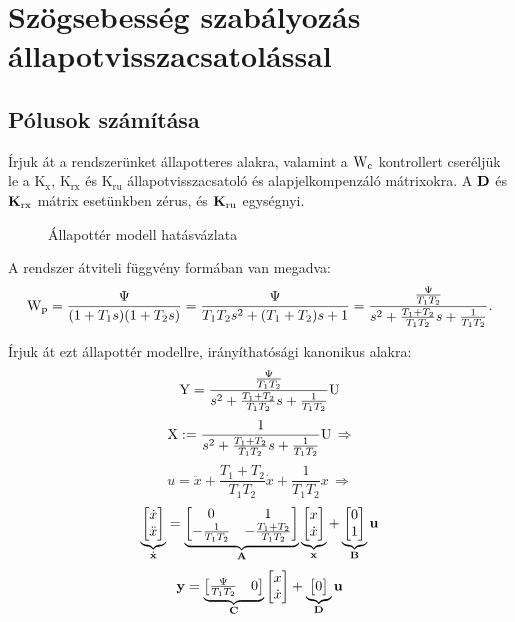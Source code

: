 \section{Szögsebesség szabályozás állapotvisszacsatolással}

\subsection{Pólusok számítása}

Írjuk át a rendszerünket állapotteres alakra, valamint a $\mathrm{W}_\text{c}$ kontrollert
cseréljük le a $\mathrm{K}_\text{x}$, $\mathrm{K}_\text{rx}$ és $\mathrm{K}_\text{ru}$ állapotvisszacsatoló és
alapjelkompenzáló mátrixokra.
A $\boldsymbol{\mathrm{D}}$ és $\boldsymbol{\mathrm{K}}_\text{rx}$ mátrix esetünkben zérus, és $\boldsymbol{\mathrm{K}}_\text{ru}$ egységnyi.

\begin{figure}[H]
    \centering
    \caption{Állapottér modell hatásvázlata}
    \label{fig:6a_allapotter_hatasvazlat}
\end{figure}

A rendszer átviteli függvény formában van megadva:
\begin{equation}
	\mathrm{W}_\text{p} = \frac{\Psi}{(1+T_1s)(1+T_2s)} = \frac{\Psi}{T_1T_2s^2+(T_1+T_2)s+1} = 
	\frac{\frac{\Psi}{T_1T_2}}{s^2+\frac{T_1+T_2}{T_1T_2}s+\frac{1}{T_1T_2}}.
\end{equation}

Írjuk át ezt állapottér modellre, irányíthatósági kanonikus alakra:
\begin{equation}
	\mathrm{Y} = \frac{\frac{\Psi}{T_1T_2}}{s^2+\frac{T_1+T_2}{T_1T_2}s+\frac{1}{T_1T_2}}\mathrm{U}
\end{equation}
\begin{equation}
	\mathrm{X} := \frac{1}{s^2+\frac{T_1+T_2}{T_1T_2}s+\frac{1}{T_1T_2}}\mathrm{U}\,\Rightarrow
\end{equation}
\begin{equation}
	u = \ddot{x} + \frac{T_1+T_2}{T_1T_2}\dot{x} + \frac{1}{T_1T_2}x\,\Rightarrow
\end{equation}
\begin{equation}
	\underbrace{\begin{bmatrix}\dot{x}\\\ddot{x} \end{bmatrix}}_{\dot{\boldsymbol{\mathrm{x}} }}
	= \underbrace{\begin{bmatrix}0&1\\-\frac{1}{T_1T_2}&-\frac{T_1+T_2}{T_1T_2} \end{bmatrix}}_{\boldsymbol{\mathrm{A}}}
	\underbrace{\begin{bmatrix}x\\\dot{x} \end{bmatrix}}_{\boldsymbol{\mathrm{x}}}
	+ \underbrace{\begin{bmatrix}0\\1\end{bmatrix}}_{\boldsymbol{\mathrm{B}}}\boldsymbol{\mathrm{u}}
\end{equation}
\begin{equation}
	\boldsymbol{\mathrm{y}} = \underbrace{\begin{bmatrix}\frac{\Psi}{T_1T_2}&0\end{bmatrix}}_{\boldsymbol{\mathrm{C}}}\begin{bmatrix}x\\\dot{x}\end{bmatrix} + \underbrace{\begin{bmatrix}0\end{bmatrix}}_{\boldsymbol{\mathrm{D}}}\boldsymbol{\mathrm{u}}
\end{equation}

